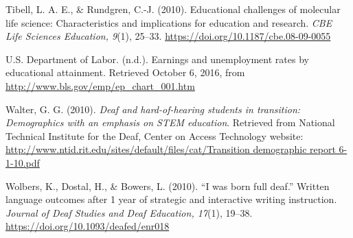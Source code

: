 \documentclass[11.5pt]{sig-alternate} %
\begin{document}
Tibell, L. A. E., \& Rundgren, C.-J. (2010). Educational challenges of molecular life science: Characteristics and implications for education and research. \textit{CBE Life Sciences Education, 9}(1), 25–33. \url{https://doi.org/10.1187/cbe.08-09-0055}

U.S. Department of Labor. (n.d.). Earnings and unemployment rates by educational attainment. Retrieved October 6, 2016, from \url{http://www.bls.gov/emp/ep\_chart\_001.htm}

Walter, G. G. (2010). \textit{Deaf and hard-of-hearing students in transition: Demographics with an emphasis on STEM education}. Retrieved from National Technical Institute for the Deaf, Center on Access Technology website: \url{http://www.ntid.rit.edu/sites/default/files/cat/Transition demographic report 6-1-10.pdf}

Wolbers, K., Dostal, H., \& Bowers, L. (2010). “I was born full deaf.” Written language outcomes after 1 year of strategic and interactive writing instruction. \textit{Journal of Deaf Studies and Deaf Education, 17}(1), 19–38. \url{https://doi.org/10.1093/deafed/enr018}
\end{document}
